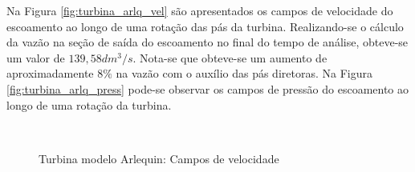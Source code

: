 Na Figura \ref{fig:turbina_arlq_vel} são apresentados os campos de velocidade do escoamento ao longo de uma rotação das pás da turbina. Realizando-se o cálculo da vazão na seção de saída do escoamento no final do tempo de análise, obteve-se um valor de $139,58dm^3/s$. Nota-se que obteve-se um aumento de aproximadamente $8\%$ na vazão com o auxílio das pás diretoras. Na Figura \ref{fig:turbina_arlq_press} pode-se observar os campos de pressão do escoamento ao longo de uma rotação da turbina.

\begin{figure}[!htbp]
	\caption{Turbina modelo Arlequin: Campos de velocidade}
	\centering
	 \
	 \\

\end{figure}
